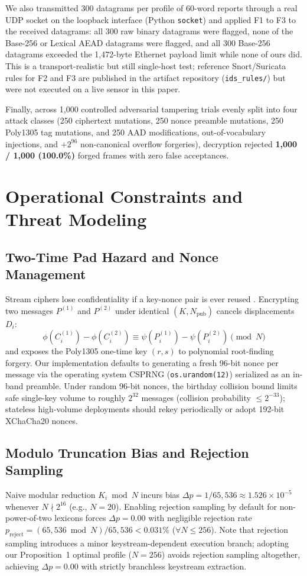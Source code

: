 \documentclass[conference]{IEEEtran}
\begin{document}
We also transmitted 300 datagrams per profile of 60-word reports through a real UDP socket on the loopback interface (Python \texttt{socket}) and applied F1 to F3 to the received datagrams: all 300 raw binary datagrams were flagged, none of the Base-256 or Lexical AEAD datagrams were flagged, and all 300 Base-256 datagrams exceeded the 1,472-byte Ethernet payload limit while none of ours did. This is a transport-realistic but still single-host test; reference Snort/Suricata rules for F2 and F3 are published in the artifact repository (\texttt{ids\_rules/}) but were not executed on a live sensor in this paper.

Finally, across 1,000 controlled adversarial tampering trials evenly split into four attack classes (250 ciphertext mutations, 250 nonce preamble mutations, 250 Poly1305 tag mutations, and 250 AAD modifications, out-of-vocabulary injections, and $+2^{96}$ non-canonical overflow forgeries), decryption rejected \textbf{1,000 / 1,000 (100.0\%)} forged frames with zero false acceptances.

\section{Operational Constraints and Threat Modeling}
\label{sec:constraints}

\subsection{Two-Time Pad Hazard and Nonce Management}
Stream ciphers lose confidentiality if a key-nonce pair is ever reused \cite{rfc8439}. Encrypting two messages $P^{(1)}$ and $P^{(2)}$ under identical $(K, N_{\text{pub}})$ cancels displacements $D_i$:
\begin{equation}
\phi(C_i^{(1)}) - \phi(C_i^{(2)}) \equiv \psi(P_i^{(1)}) - \psi(P_i^{(2)}) \pmod N
\end{equation}
and exposes the Poly1305 one-time key $(r, s)$ to polynomial root-finding forgery. Our implementation defaults to generating a fresh 96-bit nonce per message via the operating system CSPRNG (\texttt{os.urandom(12)}) serialized as an in-band preamble. Under random 96-bit nonces, the birthday collision bound limits safe single-key volume to roughly $2^{32}$ messages (collision probability $\le 2^{-33}$); stateless high-volume deployments should rekey periodically or adopt 192-bit XChaCha20 nonces.

\subsection{Modulo Truncation Bias and Rejection Sampling}
Naive modular reduction $K_i \bmod N$ incurs bias $\Delta p = 1 / 65{,}536 \approx 1.526 \times 10^{-5}$ whenever $N \nmid 2^{16}$ (e.g., $N=20$). Enabling rejection sampling by default for non-power-of-two lexicons forces $\Delta p = 0.00$ with negligible rejection rate $p_{\text{reject}} = (65{,}536 \bmod N) / 65{,}536 < 0.031\%$ ($\forall N \le 256$). Note that rejection sampling introduces a minor keystream-dependent execution branch; adopting our Proposition~1 optimal profile ($N=256$) avoids rejection sampling altogether, achieving $\Delta p = 0.00$ with strictly branchless keystream extraction.
\end{document}

